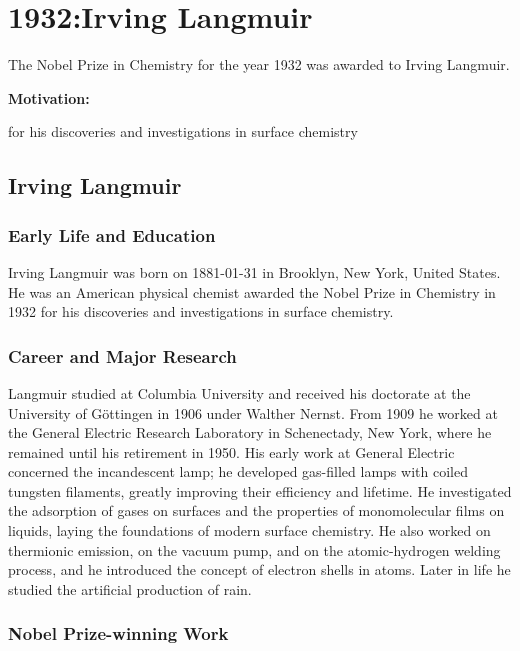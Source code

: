 \chapter{1932:Irving Langmuir}

\label{chap:chemistry1932}

The Nobel Prize in Chemistry for the year 1932 was awarded to Irving Langmuir.

\textbf{Motivation:}

for his discoveries and investigations in surface chemistry

\section{Irving Langmuir}

\subsection*{Early Life and Education}

Irving Langmuir was born on 1881-01-31 in Brooklyn, New York, United States.
He was an American physical chemist awarded the Nobel Prize in Chemistry in 1932 for his discoveries and investigations in surface chemistry.

\subsection*{Career and Major Research}

Langmuir studied at Columbia University and received his doctorate at the University of Göttingen in 1906 under Walther Nernst.
From 1909 he worked at the General Electric Research Laboratory in Schenectady, New York, where he remained until his retirement in 1950.
His early work at General Electric concerned the incandescent lamp; he developed gas-filled lamps with coiled tungsten filaments, greatly improving their efficiency and lifetime.
He investigated the adsorption of gases on surfaces and the properties of monomolecular films on liquids, laying the foundations of modern surface chemistry.
He also worked on thermionic emission, on the vacuum pump, and on the atomic-hydrogen welding process, and he introduced the concept of electron shells in atoms.
Later in life he studied the artificial production of rain.

\subsection*{Nobel Prize-winning Work}

